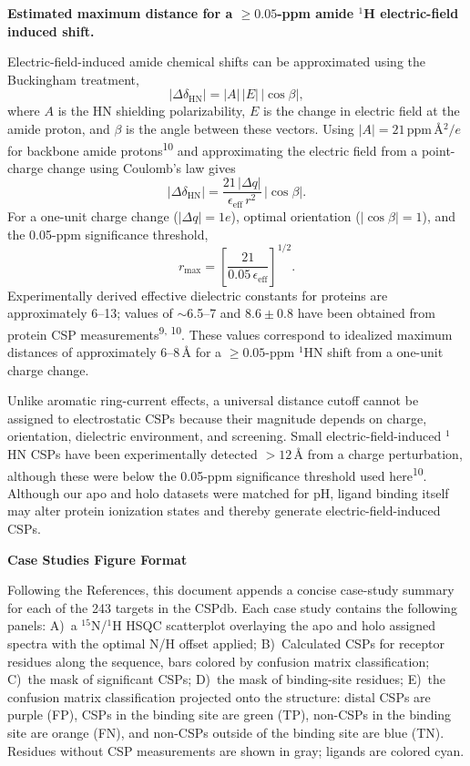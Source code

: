 \documentclass[11pt]{article}
\begin{document}
\textbf{Estimated maximum distance for a $\geq 0.05$-ppm amide $^{1}$H electric-field induced shift.}

Electric-field-induced amide chemical shifts can be approximated using the
Buckingham treatment,
\begin{equation*}
|\Delta\delta_{\mathrm{HN}}| = |A|\,|E|\,|\cos\beta|,
\end{equation*}
where $A$ is the HN shielding polarizability, $E$ is the change in electric
field at the amide proton, and $\beta$ is the angle between these vectors.
Using $|A|=21$\,ppm\,\AA{}$^{2}/e$ for backbone amide protons\textsuperscript{10}
and approximating the electric field from a point-charge change using Coulomb's
law gives
\begin{equation*}
|\Delta\delta_{\mathrm{HN}}| = \frac{21\,|\Delta q|}{\epsilon_{\mathrm{eff}}\,r^{2}}\,|\cos\beta|.
\end{equation*}
For a one-unit charge change ($|\Delta q|=1e$), optimal orientation
($|\cos\beta|=1$), and the 0.05-ppm significance threshold,
\begin{equation*}
r_{\max}=\left[\frac{21}{0.05\,\epsilon_{\mathrm{eff}}}\right]^{1/2}.
\end{equation*}
Experimentally derived effective dielectric constants for proteins are
approximately 6--13; values of $\sim$6.5--7 and $8.6\pm 0.8$ have been obtained
from protein CSP measurements\textsuperscript{9, 10}. These values correspond
to idealized maximum distances of approximately 6--8\,\AA{} for a
$\geq 0.05$-ppm $^{1}$HN shift from a one-unit charge change.

Unlike aromatic ring-current effects, a universal distance cutoff cannot be
assigned to electrostatic CSPs because their magnitude depends on charge,
orientation, dielectric environment, and screening. Small electric-field-induced
$^{1}$HN CSPs have been experimentally detected $>12$\,\AA{} from a charge
perturbation, although these were below the 0.05-ppm significance threshold used
here\textsuperscript{10}. Although our apo and holo datasets were matched for
pH, ligand binding itself may alter protein ionization states and thereby
generate electric-field-induced CSPs.

\vspace{0.4em}
\noindent\textbf{Case Studies Figure Format}

Following the References, this document appends a concise case-study summary for
each of the 243 targets in the CSPdb. Each case study contains the following
panels: A)~a $^{15}$N/$^{1}$H HSQC scatterplot overlaying the apo and holo
assigned spectra with the optimal N/H offset applied; B)~Calculated CSPs for
receptor residues along the sequence, bars colored by confusion matrix
classification; C)~the mask of significant CSPs; D)~the mask of binding-site
residues; E)~the confusion matrix classification projected onto the structure:
distal CSPs are purple (FP), CSPs in the binding site are green (TP),
non-CSPs in the binding site are orange (FN), and non-CSPs outside of the
binding site are blue (TN). Residues without CSP measurements are shown in gray;
ligands are colored cyan.
\end{document}
